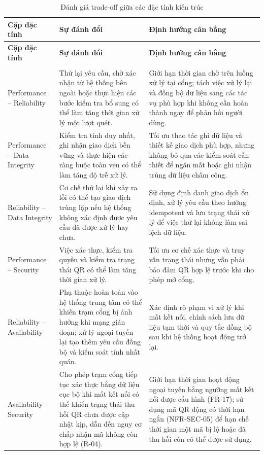 \small
\renewcommand{\arraystretch}{1.3}
\begin{longtable}{|>{\raggedright\arraybackslash}p{3.5cm}|>{\raggedright\arraybackslash}p{5.8cm}|>{\raggedright\arraybackslash}p{5.8cm}|}
\caption{Đánh giá trade-off giữa các đặc tính kiến trúc}\label{tab:tradeoffs} \\
\hline
\textbf{Cặp đặc tính} & \textbf{Sự đánh đổi} & \textbf{Định hướng cân bằng} \\
\hline
\endfirsthead
\hline
\textbf{Cặp đặc tính} & \textbf{Sự đánh đổi} & \textbf{Định hướng cân bằng} \\
\hline
\endhead
\hline
\multicolumn{3}{r}{\textit{Còn tiếp sang trang sau...}} \\
\hline
\endfoot
\hline
\endlastfoot
Performance -- Reliability & Thử lại yêu cầu, chờ xác nhận từ hệ thống bên ngoài hoặc thực hiện các bước kiểm tra bổ sung có thể làm tăng thời gian xử lý một lượt quét. & Giới hạn thời gian chờ trên luồng xử lý tại cổng; tách việc xử lý lại và đồng bộ dữ liệu sang các tác vụ phù hợp khi không cần hoàn thành ngay để phản hồi người dùng. \\
\hline
Performance -- Data Integrity & Kiểm tra tính duy nhất, ghi nhận giao dịch bền vững và thực hiện các ràng buộc toàn vẹn có thể làm tăng độ trễ xử lý. & Tối ưu thao tác ghi dữ liệu và thiết kế giao dịch phù hợp, nhưng không bỏ qua các kiểm soát cần thiết để ngăn mất hoặc ghi nhận trùng dữ liệu chấm công. \\
\hline
Reliability -- Data Integrity & Cơ chế thử lại khi xảy ra lỗi có thể tạo giao dịch trùng lặp nếu hệ thống không xác định được yêu cầu đã được xử lý hay chưa. & Sử dụng định danh giao dịch ổn định, xử lý yêu cầu theo hướng idempotent và lưu trạng thái xử lý để việc thử lại không làm sai lệch dữ liệu. \\
\hline
Performance -- Security & Việc xác thực, kiểm tra quyền và kiểm tra trạng thái QR có thể làm tăng thời gian xử lý. & Tối ưu cơ chế xác thực và truy vấn trạng thái nhưng vẫn phải bảo đảm QR hợp lệ trước khi cho phép mở cổng. \\
\hline
Reliability -- Availability & Phụ thuộc hoàn toàn vào hệ thống trung tâm có thể khiến trạm cổng bị ảnh hưởng khi mạng gián đoạn; xử lý ngoại tuyến lại tạo thêm yêu cầu đồng bộ và kiểm soát tính nhất quán. & Xác định rõ phạm vi xử lý khi mất kết nối, chính sách lưu dữ liệu tạm thời và quy tắc đồng bộ sau khi hệ thống hoạt động trở lại. \\
\hline
Availability -- Security & Cho phép trạm cổng tiếp tục xác thực bằng dữ liệu cục bộ khi mất kết nối có thể khiến trạng thái thu hồi QR chưa được cập nhật kịp, dẫn đến nguy cơ chấp nhận mã không còn hợp lệ (R-04). & Giới hạn thời gian hoạt động ngoại tuyến bằng ngưỡng mất kết nối được cấu hình (FR-17); sử dụng mã QR động có thời hạn ngắn (NFR-SEC-05) để hạn chế thời gian một mã bị lộ hoặc đã thu hồi còn có thể được sử dụng. \\
\end{longtable}
\normalsize

